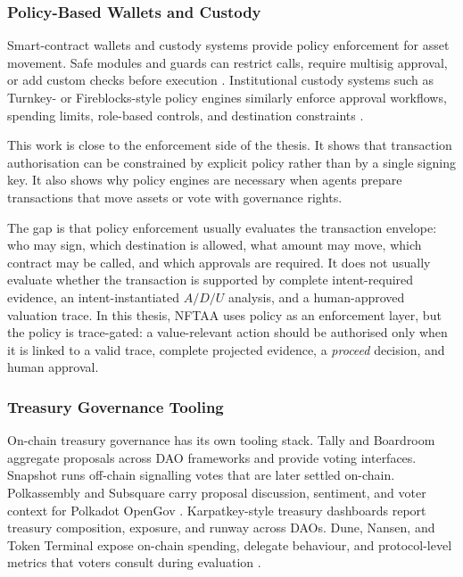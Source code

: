 \subsubsection{Policy-Based Wallets and Custody}

Smart-contract wallets and custody systems provide policy enforcement for asset
movement. Safe modules and guards can restrict calls, require multisig approval,
or add custom checks before execution \cite{Liochon2023}. Institutional custody
systems such as Turnkey- or Fireblocks-style policy engines similarly enforce
approval workflows, spending limits, role-based controls, and destination
constraints \cite{TurnkeyPolicyEngine, FireblocksPolicyEngine,
ZetzscheNikolakopoulou2025CryptoCustody}.

This work is close to the enforcement side of the thesis. It shows that
transaction authorisation can be constrained by explicit policy rather than by a
single signing key. It also shows why policy engines are necessary when agents
prepare transactions that move assets or vote with governance rights.

The gap is that policy enforcement usually evaluates the transaction envelope:
who may sign, which destination is allowed, what amount may move, which contract
may be called, and which approvals are required. It does not usually evaluate
whether the transaction is supported by complete intent-required evidence, an
intent-instantiated $A/D/U$ analysis, and a human-approved valuation trace. In
this thesis, NFTAA uses policy as an enforcement layer, but the policy is
trace-gated: a value-relevant action should be authorised only when it is linked
to a valid trace, complete projected evidence, a \textit{proceed} decision, and
human approval.

\subsubsection{Treasury Governance Tooling}

On-chain treasury governance has its own tooling stack. Tally and Boardroom
aggregate proposals across DAO frameworks and provide voting interfaces.
Snapshot runs off-chain signalling votes that are later settled on-chain.
Polkassembly and Subsquare carry proposal discussion, sentiment, and voter
context for Polkadot OpenGov \cite{Valastin2024proto, PolkassemblyArchive,
SubsquareReferenda}. Karpatkey-style treasury dashboards report treasury
composition, exposure, and runway across DAOs.
Dune, Nansen, and Token Terminal expose on-chain spending, delegate
behaviour, and protocol-level metrics that voters consult during evaluation
\cite{TallyGovernanceDocs, BoardroomGovernanceAPI, SnapshotDocs, KpkDocs,
Saesen2026DAOGovernancePerformance}.


